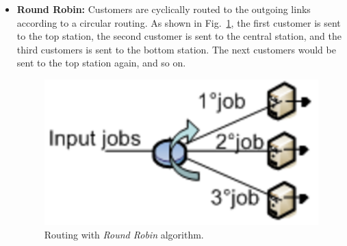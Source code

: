 \begin{itemize}
\item \textbf{Round Robin:} Customers are cyclically routed to the
outgoing links according to a circular routing. As shown in
Fig.~\ref{fig:routrr}, the first customer is sent to the top
station, the second customer is sent to the central station, and
the third customers is sent to the bottom station. The next
customers would be sent to the top station again, and so on.
\begin{figure}[htb]
    \begin{center}
        \includegraphics[scale=.5]{img/jsimg/8.8.eps}
    \end{center}
    \caption{Routing with \emph{Round Robin} algorithm.}
    \label{fig:routrr}
\end{figure}


\end{itemize}

